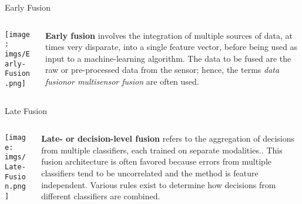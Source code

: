 \documentclass[aspectratio=169]{beamer}
\begin{document}
\begin{frame}{Early Fusion}
    \begin{columns}
        \begin{column}{.3\textwidth}
            \texttt{[image: imgs/Early-Fusion.png]}
        \end{column}
        \begin{column}{.6\textwidth}
            \large\textbf{Early fusion} involves the integration of multiple
            sources of data, at times very disparate, into a single feature
            vector, before
            being used as input to a machine-learning algorithm. The data to be
            fused are
            the raw or pre-processed data from the sensor; hence, the terms
            \emph{data
                fusionor multisensor fusion} are often used.
        \end{column}
    \end{columns}
\end{frame}

\begin{frame}{Late Fusion}
    \begin{columns}
        \begin{column}{.3\textwidth}
            \texttt{[image: imgs/Late-Fusion.png]}
        \end{column}
        \begin{column}{.6\textwidth}
            \large\textbf{Late- or decision-level fusion} refers to the
            aggregation of decisions from multiple classifiers, each trained on
            separate
            modalities.. This fusion architecture is often favored because
            errors from
            multiple classifiers tend to be uncorrelated and the method is
            feature
            independent. Various rules exist to determine how decisions from
            different
            classifiers are combined.
        \end{column}
    \end{columns}
\end{frame}
\end{document}
